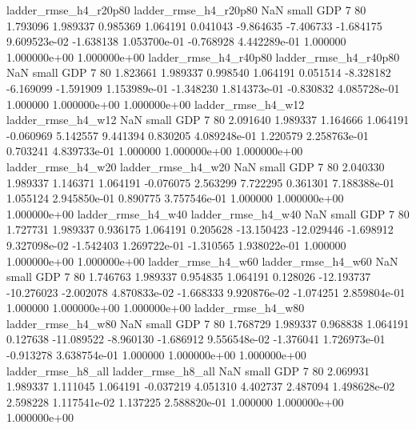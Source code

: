    ladder_rmse_h4_r20p80    ladder_rmse_h4_r20p80                   NaN      small      GDP                 7 80 1.793096       1.989337 0.985369       1.064191    0.041043     -9.864635     -7.406733    -1.684175   9.609523e-02 -1.638138 1.053700e-01    -0.768928   4.442289e-01            1.000000    1.000000e+00        1.000000e+00
   ladder_rmse_h4_r40p80    ladder_rmse_h4_r40p80                   NaN      small      GDP                 7 80 1.823661       1.989337 0.998540       1.064191    0.051514     -8.328182     -6.169099    -1.591909   1.153989e-01 -1.348230 1.814373e-01    -0.830832   4.085728e-01            1.000000    1.000000e+00        1.000000e+00
      ladder_rmse_h4_w12       ladder_rmse_h4_w12                   NaN      small      GDP                 7 80 2.091640       1.989337 1.164666       1.064191   -0.060969      5.142557      9.441394     0.830205   4.089248e-01  1.220579 2.258763e-01     0.703241   4.839733e-01            1.000000    1.000000e+00        1.000000e+00
      ladder_rmse_h4_w20       ladder_rmse_h4_w20                   NaN      small      GDP                 7 80 2.040330       1.989337 1.146371       1.064191   -0.076075      2.563299      7.722295     0.361301   7.188388e-01  1.055124 2.945850e-01     0.890775   3.757546e-01            1.000000    1.000000e+00        1.000000e+00
      ladder_rmse_h4_w40       ladder_rmse_h4_w40                   NaN      small      GDP                 7 80 1.727731       1.989337 0.936175       1.064191    0.205628    -13.150423    -12.029446    -1.698912   9.327098e-02 -1.542403 1.269722e-01    -1.310565   1.938022e-01            1.000000    1.000000e+00        1.000000e+00
      ladder_rmse_h4_w60       ladder_rmse_h4_w60                   NaN      small      GDP                 7 80 1.746763       1.989337 0.954835       1.064191    0.128026    -12.193737    -10.276023    -2.002078   4.870833e-02 -1.668333 9.920876e-02    -1.074251   2.859804e-01            1.000000    1.000000e+00        1.000000e+00
      ladder_rmse_h4_w80       ladder_rmse_h4_w80                   NaN      small      GDP                 7 80 1.768729       1.989337 0.968838       1.064191    0.127638    -11.089522     -8.960130    -1.686912   9.556548e-02 -1.376041 1.726973e-01    -0.913278   3.638754e-01            1.000000    1.000000e+00        1.000000e+00
      ladder_rmse_h8_all       ladder_rmse_h8_all                   NaN      small      GDP                 7 80 2.069931       1.989337 1.111045       1.064191   -0.037219      4.051310      4.402737     2.487094   1.498628e-02  2.598228 1.117541e-02     1.137225   2.588820e-01            1.000000    1.000000e+00        1.000000e+00
